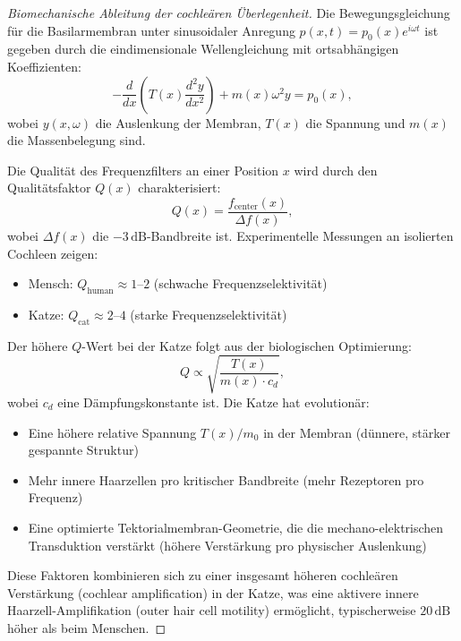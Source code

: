 ﻿\documentclass[12pt, a4paper]{article}
\theoremstyle{definition}
\theoremstyle{remark}
\begin{document}
\begin{proof}[Biomechanische Ableitung der cochleären Überlegenheit]
Die Bewegungsgleichung für die Basilarmembran unter sinusoidaler Anregung $p(x,t) = p_0(x) e^{i\omega t}$ ist gegeben durch die eindimensionale Wellengleichung mit ortsabhängigen Koeffizienten:
\begin{equation}
-\frac{d}{dx}\left(T(x)\frac{d^2y}{dx^2}\right) + m(x)\omega^2 y = p_0(x),
\label{eq:basilar_wave}
\end{equation}
wobei $y(x,\omega)$ die Auslenkung der Membran, $T(x)$ die Spannung und $m(x)$ die Massenbelegung sind.

Die Qualität des Frequenzfilters an einer Position $x$ wird durch den Qualitätsfaktor $Q(x)$ charakterisiert:
\begin{equation}
Q(x) = \frac{f_{\text{center}}(x)}{\Delta f(x)},
\label{eq:quality_factor}
\end{equation}
wobei $\Delta f(x)$ die $-3\,\mathrm{dB}$-Bandbreite ist. Experimentelle Messungen an isolierten Cochleen zeigen:

\begin{itemize}
\item Mensch: $Q_{\text{human}} \approx 1$--$2$ (schwache Frequenzselektivität)
\item Katze: $Q_{\text{cat}} \approx 2$--$4$ (starke Frequenzselektivität)
\end{itemize}

Der höhere $Q$-Wert bei der Katze folgt aus der biologischen Optimierung:
\begin{equation}
Q \propto \sqrt{\frac{T(x)}{m(x) \cdot c_d}},
\label{eq:q_scaling}
\end{equation}
wobei $c_d$ eine Dämpfungskonstante ist. Die Katze hat evolutionär:
\begin{itemize}
\item Eine höhere relative Spannung $T(x) / m_0$ in der Membran (dünnere, stärker gespannte Struktur)
\item Mehr innere Haarzellen pro kritischer Bandbreite (mehr Rezeptoren pro Frequenz)
\item Eine optimierte Tektorialmembran-Geometrie, die die mechano-elektrischen Transduktion verstärkt (höhere Verstärkung pro physischer Auslenkung)
\end{itemize}

Diese Faktoren kombinieren sich zu einer insgesamt höheren cochleären Verstärkung (cochlear amplification) in der Katze, was eine aktivere innere Haarzell-Amplifikation (outer hair cell motility) ermöglicht, typischerweise $20\,\mathrm{dB}$ höher als beim Menschen.
\end{proof}
\end{document}
